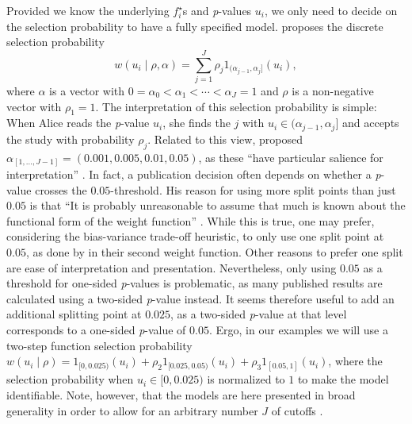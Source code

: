 \documentclass[useAMS,usenatbib,referee]{biom}
\begin{document}
Provided we know the underlying $f_{i}^{\star}$s and \textit{p}-values $u_i$, we only need to decide on the selection probability to have a fully specified model. \citet{hedges1992modeling} proposes the discrete selection probability
\begin{equation}
w(u_i\mid\rho,\alpha)=\sum_{j=1}^{J}\rho_{j}1_{(\alpha_{j-1},\alpha_{j}]}(u_i),
\end{equation}
where $\alpha$ is a vector with $0=\alpha_{0}<\alpha_{1}<\cdots<\alpha_{J}=1$ and $\rho$ is a non-negative vector with $\rho_{1}=1$. The interpretation of this selection probability is simple: When Alice reads the \textit{p}-value $u_i$, she finds the $j$ with $u_i\in(\alpha_{j-1},\alpha_{j}]$ and accepts the study with probability $\rho_{j}$. Related to this view, \citet{hedges1992modeling} proposed $\alpha_{[1,\dots,J-1]} = (0.001,0.005,0.01,0.05)$, as these \enquote{have particular salience for interpretation} \citep{hedges1992modeling}. In fact, a publication decision often depends on whether a \textit{p}-value crosses the $0.05$-threshold. His reason for using more split points than just $0.05$ is that \enquote{It is probably unreasonable to assume that much is known about the functional form of the weight function} \citep{hedges1992modeling}. While this is true, one may prefer, considering the bias-variance trade-off heuristic, to only use one split point at $0.05$, as done by \citet{iyengar1988selection} in their second weight function. Other reasons to prefer one split are ease of interpretation and presentation. Nevertheless, only using $0.05$ as a threshold for one-sided \textit{p}-values is problematic, as many published results are calculated using a two-sided \textit{p}-value instead. It seems therefore useful to add an additional splitting point at $0.025$, as a two-sided \textit{p}-value at that level corresponds to a one-sided \textit{p}-value of $0.05$. Ergo, in our examples we will use a two-step function selection probability $w(u_i\mid\rho)=1_{[0,0.025)}(u_i)+\rho_{2}1_{[0.025,0.05)}(u_i)+\rho_{3}1_{\left[0.05,1\right]}(u_i)$, where the selection probability when $u_i\in[0,0.025)$ is normalized to $1$ to make the model identifiable. Note, however, that the models are here presented in broad generality in order to allow for an arbitrary number $J$ of cutoffs \citep[this possibility is already implemented in the R package associated with this paper, \texttt{publipha}, see][for more details]{publipha}.
\end{document}
